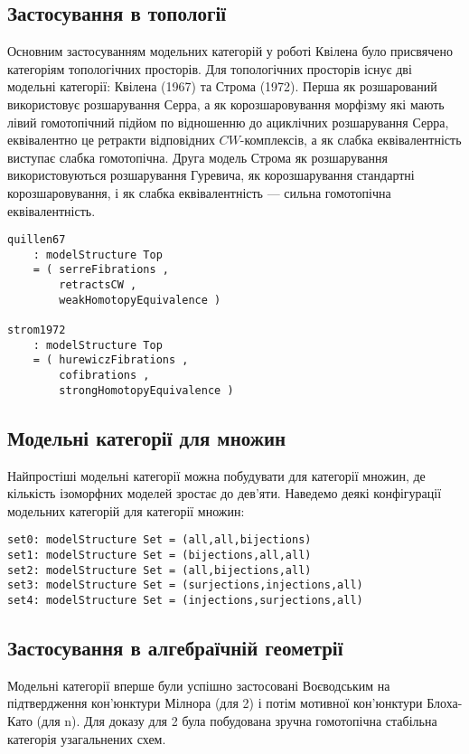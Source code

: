 \documentclass[12pt]{article}
\theoremstyle{plain}
\theoremstyle{definition}
\theoremstyle{remark}
\begin{document}
\subsection{Застосування в топології}
Основним застосуванням модельних категорій у роботі Квілена було присвячено категоріям топологічних просторів. Для топологічних просторів існує дві модельні категорії: Квілена (1967) та Строма (1972). Перша як розшарований використовує розшарування Серра, а як корозшаровування морфізму які мають лівий гомотопічний підйом по відношенню до ациклічних розшарування Серра, еквівалентно це ретракти відповідних $CW$-комплексів, а як слабка еквівалентність виступає слабка гомотопічна. Друга модель Строма як розшарування використовуються розшарування Гуревича, як корозшарування стандартні корозшаровування, і як слабка еквівалентність --- сильна гомотопічна еквівалентність.

\begin{lstlisting}
quillen67
    : modelStructure Top
    = ( serreFibrations ,
        retractsCW ,
        weakHomotopyEquivalence )

strom1972
    : modelStructure Top
    = ( hurewiczFibrations ,
        cofibrations ,
        strongHomotopyEquivalence )
\end{lstlisting}

\subsection{Модельні категорії для множин}
Найпростіші модельні категорії можна побудувати для категорії множин, де кількість ізоморфних моделей зростає до дев'яти. Наведемо деякі конфігурації модельних категорій для категорії множин:

\begin{lstlisting}
set0: modelStructure Set = (all,all,bijections)
set1: modelStructure Set = (bijections,all,all)
set2: modelStructure Set = (all,bijections,all)
set3: modelStructure Set = (surjections,injections,all)
set4: modelStructure Set = (injections,surjections,all)
\end{lstlisting}

\subsection{Застосування в алгебраїчній геометрії}
Модельні категорії вперше були успішно застосовані Воєводським на підтвердження кон'юнктури Мілнора \cite{Voevodsky96} (для 2) і потім мотивної кон'юнктури Блоха-Като \cite{Voevodsky03} (для n). Для доказу для 2 була побудована зручна гомотопічна стабільна категорія узагальнених схем.
\end{document}
